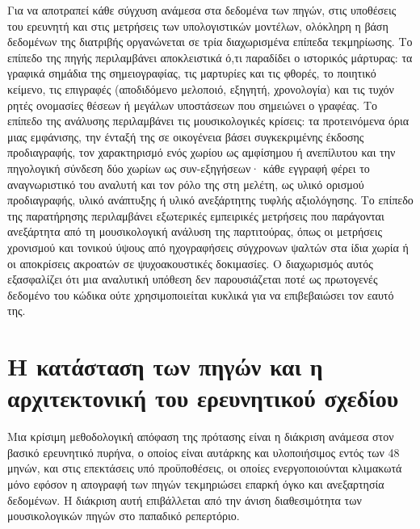 \documentclass[11pt,a4paper]{article}
\begin{document}
Για να αποτραπεί κάθε σύγχυση ανάμεσα στα δεδομένα των πηγών, στις υποθέσεις του ερευνητή και στις μετρήσεις των υπολογιστικών μοντέλων, ολόκληρη η βάση δεδομένων της διατριβής οργανώνεται σε τρία διαχωρισμένα επίπεδα τεκμηρίωσης. Το επίπεδο της πηγής περιλαμβάνει αποκλειστικά ό,τι παραδίδει ο ιστορικός μάρτυρας: τα γραφικά σημάδια της σημειογραφίας, τις μαρτυρίες και τις φθορές, το ποιητικό κείμενο, τις επιγραφές (αποδιδόμενο μελοποιό, εξηγητή, χρονολογία) και τις τυχόν ρητές ονομασίες θέσεων ή μεγάλων υποστάσεων που σημειώνει ο γραφέας. Το επίπεδο της ανάλυσης περιλαμβάνει τις μουσικολογικές κρίσεις: τα προτεινόμενα όρια μιας εμφάνισης, την ένταξή της σε οικογένεια βάσει συγκεκριμένης έκδοσης προδιαγραφής, τον χαρακτηρισμό ενός χωρίου ως αμφίσημου ή ανεπίλυτου και την πηγολογική σύνδεση δύο χωρίων ως συν-εξηγήσεων· κάθε εγγραφή φέρει το αναγνωριστικό του αναλυτή και τον ρόλο της στη μελέτη, ως υλικό ορισμού προδιαγραφής, υλικό ανάπτυξης ή υλικό ανεξάρτητης τυφλής αξιολόγησης. Το επίπεδο της παρατήρησης περιλαμβάνει εξωτερικές εμπειρικές μετρήσεις που παράγονται ανεξάρτητα από τη μουσικολογική ανάλυση της παρτιτούρας, όπως οι μετρήσεις χρονισμού και τονικού ύψους από ηχογραφήσεις σύγχρονων ψαλτών στα ίδια χωρία ή οι αποκρίσεις ακροατών σε ψυχοακουστικές δοκιμασίες. Ο διαχωρισμός αυτός εξασφαλίζει ότι μια αναλυτική υπόθεση δεν παρουσιάζεται ποτέ ως πρωτογενές δεδομένο του κώδικα ούτε χρησιμοποιείται κυκλικά για να επιβεβαιώσει τον εαυτό της.

\section{Η κατάσταση των πηγών και η αρχιτεκτονική του ερευνητικού σχεδίου}

Μια κρίσιμη μεθοδολογική απόφαση της πρότασης είναι η διάκριση ανάμεσα στον βασικό ερευνητικό πυρήνα, ο οποίος είναι αυτάρκης και υλοποιήσιμος εντός των 48 μηνών, και στις επεκτάσεις υπό προϋποθέσεις, οι οποίες ενεργοποιούνται κλιμακωτά μόνο εφόσον η απογραφή των πηγών τεκμηριώσει επαρκή όγκο και ανεξαρτησία δεδομένων. Η διάκριση αυτή επιβάλλεται από την άνιση διαθεσιμότητα των μουσικολογικών πηγών στο παπαδικό ρεπερτόριο.
\end{document}
